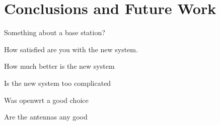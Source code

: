 \section{Conclusions and Future Work}
Something about a base station?

How satisfied are you with the new system.

How much better is the new system

Is the new system too complicated

Was openwrt a good choice

Are the antennas any good


